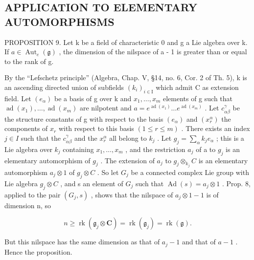 \subsection{APPLICATION TO ELEMENTARY AUTOMORPHISMS}

PROPOSITION 9. Let k be a field of characteristic 0 and g a Lie algebra over k. If \(a \in \operatorname{Aut}_{e}(\mathfrak{g})\) , the dimension of the nilspace of a - 1 is greater than or equal to the rank of g.

By the ``Lefschetz principle'' (Algebra, Chap. V, §14, no. 6, Cor. 2 of Th. 5), k is an ascending directed union of subfields \((k_{i})_{i\in\mathrm{I}}\) which admit C as extension field. Let \((e_{\alpha})\) be a basis of g over k and \(x_{1},\ldots,x_{m}\) elements of g such that \(\operatorname{ad}(x_{1}),\ldots,\operatorname{ad}(x_{m})\) are nilpotent and \(a=e^{\operatorname{ad}(x_{1})}\ldots e^{\operatorname{ad}(x_{m})}\) . Let \(c_{\alpha\beta}^{\gamma}\) be the structure constants of g with respect to the basis \((e_{\alpha})\) and \((x_{r}^{\alpha})\) the components of \(x_{r}\) with respect to this basis \((1\leq r\leq m)\) . There exists an index \(j\in I\) such that the \(c_{\alpha\beta}^{\gamma}\) and the \(x_{r}^{\alpha}\) all belong to \(k_{j}\) . Let \(g_{j}=\sum_{\alpha}k_{j}e_{\alpha}\) ; this is a Lie algebra over \(k_{j}\) containing \(x_{1},\ldots,x_{m}\) , and the restriction \(a_{j}\) of a to \(g_{j}\) is an elementary automorphism of \(g_{j}\) . The extension of \(a_{j}\) to \(g_{j}\otimes_{k_{j}}C\) is an elementary automorphism \(a_{j}\otimes1\) of \(g_{j}\otimes C\) . So let \(G_{j}\) be a connected complex Lie group with Lie algebra \(g_{j}\otimes C\) , and s an element of \(G_{j}\) such that \(\operatorname{Ad}(s)=a_{j}\otimes1\) . Prop. 8, applied to the pair \((G_{j},s)\) , shows that the nilspace of \(a_{j}\otimes1-1\) is of dimension n, so

\[
n \geq \operatorname{rk} (\mathfrak {g} _ {j} \otimes \mathbf {C}) = \operatorname{rk} (\mathfrak {g} _ {j}) = \operatorname{rk} (\mathfrak {g}).
\]

But this nilspace has the same dimension as that of \(a_{j} - 1\) and that of \(a - 1\) . Hence the proposition.

